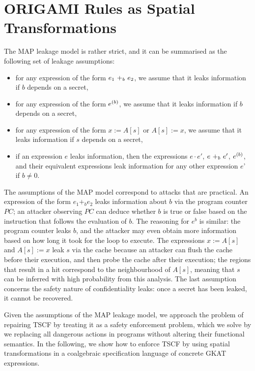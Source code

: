 \section{ORIGAMI Rules as Spatial Transformations}
The MAP leakage model is rather strict, and it can be summarised as the following set of leakage assumptions:
\begin{itemize}
    \item for any expression of the form $\branch{b}{e_1}{e_2}$, we assume that it leaks information if $b$ depends on a secret,
    \item for any expression of the form $\iterate{b}{e}$, we assume that it leaks information if $b$ depends on a secret,
    \item for any expression of the form $x:=A[s]$ or $A[s]:=x$, we assume that it leaks information if $s$ depends on a secret,
    \item if an expression $e$ leaks information, then the expressions $e\cdot e'$, $\branch{b}{e}{e'}$, $\iterate{b}{e}$, and their equivalent expressions leak information for any other expression $e$' if $b\neq 0$.
\end{itemize}
The assumptions of the MAP model correspond to attacks that are practical. An expression of the form $e_1 +_b e_2$ leaks information about $b$ via the program counter $PC$; an attacker observing $PC$ can deduce whether $b$ is true or false based on the instruction that follows the evaluation of $b$. The reasoning for $e^b$ is similar: the program counter leaks $b$, and the attacker may even obtain more information based on how long it took for the loop to execute. The expressions $x:=A[s]$ and $A[s]:=x$ leak $s$ via the cache because an attacker can flush the cache before their execution, and then probe the cache after their execution; the regions that result in a hit correspond to the neighbourhood of $A[s]$, meaning that $s$ can be inferred with high probability from this analysis. The last assumption concerns the safety nature of confidentiality leaks: once a secret has been leaked, it cannot be recovered.

Given the assumptions of the MAP leakage model, we approach the problem of repairing TSCF by treating it as a safety enforcement problem, which we solve by  we replacing all dangerous actions in programs without altering their functional semantics. In the following, we show how to enforce TSCF by using spatial transformations in a coalgebraic specification language of concrete GKAT expressions. 


